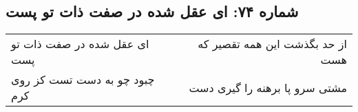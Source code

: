 \begin{center}
\section*{شماره ۷۴: ای عقل شده در صفت ذات تو پست}
\label{sec:074}
\begin{longtable}{l p{0.5cm} r}
ای عقل شده در صفت ذات تو پست
&&
از حد بگذشت این همه تقصیر که هست
\\
چبود چو به دست تست کز روی کرم
&&
مشتی سرو پا برهنه را گیری دست
\\
\end{longtable}
\end{center}

